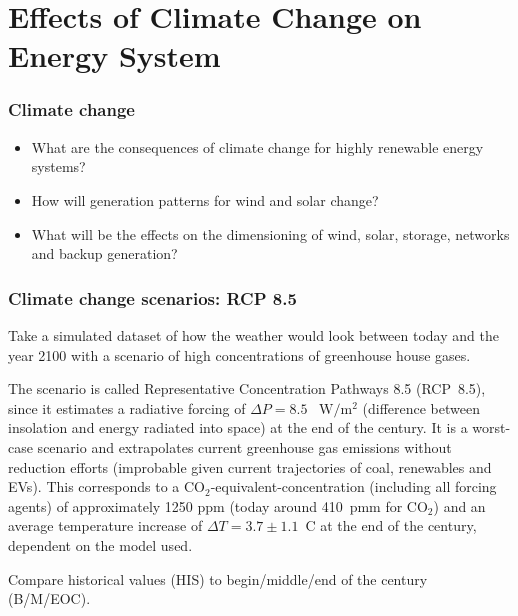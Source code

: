 \documentclass[10pt,aspectratio=169,dvipsnames]{beamer}
\let\olditem\item
\renewcommand{\item}{%
\olditem\vspace{5pt}}
\begin{document}
\section{Effects of Climate Change on Energy System}


\begin{frame}
  \frametitle{Climate change}

  \begin{itemize}
  \item   What are the consequences of climate change for highly renewable energy systems?
  \item How will generation patterns for wind and solar change?
    \item What will be the effects on the dimensioning of wind,
      solar, storage, networks and backup generation?
  \end{itemize}

\end{frame}

\begin{frame}
  \frametitle{Climate change scenarios: RCP 8.5}

  Take a simulated dataset of how the weather would look
  between today and the year 2100 with a scenario of high
  concentrations of greenhouse house gases.

  The scenario is called Representative Concentration Pathways 8.5
  (RCP~8.5), since it estimates a radiative forcing of $\Delta P = 8.5$~
  $\mathrm{W}/ \mathrm{m}^2$ (difference between insolation and energy
  radiated into space) at the end of the century. It is a \alert{worst-case scenario} and extrapolates current greenhouse gas emissions
  without reduction efforts (improbable given current trajectories of coal, renewables and EVs). This corresponds to a
  CO$_2$-equivalent-concentration (including all forcing agents) of
  approximately 1250 ppm (today around 410~pmm for CO$_2$) and an
  average temperature increase of $\Delta T = 3.7 \pm 1.1$~C at the
  end of the century, dependent on the model used.

  Compare historical values (HIS) to begin/middle/end of the century (B/M/EOC).

\end{frame}
\end{document}
